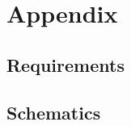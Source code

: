 \section{Appendix}
\subsection{Requirements}\label{app:requirements}
\clearpage

\subsection{Schematics}
\label{app:schematic}

